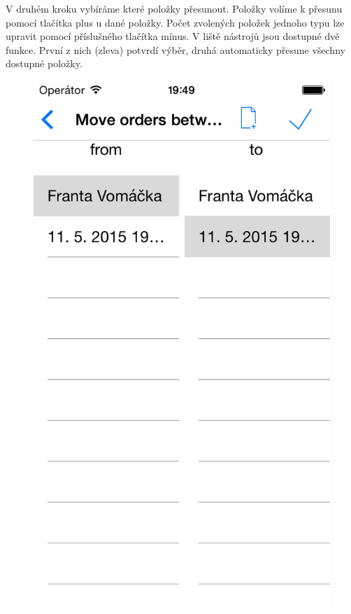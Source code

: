 V druhém kroku vybíráme které položky přesunout.
Položky volíme k přesunu pomocí tlačítka plus u dané položky.
Počet zvolených položek jednoho typu lze upravit pomocí příslušného tlačítka mínus.
V liště nástrojů jsou dostupné dvě funkce.
První z nich (zleva) potvrdí výběr, druhá automaticky přesune všechny dostupné položky.\\

\begin{figure}[h]
\centering
\begin{minipage}{.5\textwidth}
  \centering
  \includegraphics[width=.95\textwidth]{move1.png}

\end{minipage}
\end{figure}
